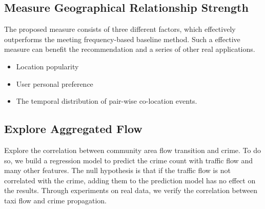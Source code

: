 \documentclass[11pt]{article}
\begin{document}
\subsection{Measure Geographical Relationship Strength}


The proposed measure consists of three different factors, which effectively outperforms the meeting frequency-based baseline method. Such a effective measure can benefit the recommendation and a series of other real applications. 
\begin{itemize}
\item Location popularity
\item User personal preference
\item The temporal distribution of pair-wise co-location events.
\end{itemize}


\subsection{Explore Aggregated Flow}
Explore the correlation between community area flow transition and crime. To do so, we build a regression model to predict the crime count with traffic flow and many other features. The null hypothesis is that if the traffic flow is not correlated with the crime, adding them to the prediction model has no effect on the results. Through experiments on real data, we verify the correlation between taxi flow and crime propagation.






\end{document}
